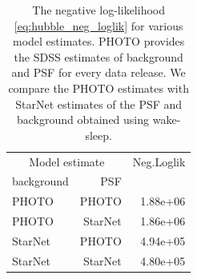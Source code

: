 
\begin{table}[ht]
\centering
\caption{The negative log-likelihood \eqref{eq:hubble_neg_loglik} for various model estimates. PHOTO provides the SDSS estimates of background and PSF for every data release. 
We compare the PHOTO estimates with StarNet estimates of the PSF and background obtained using wake-sleep. }
\label{tab:chi-square-stats1}
\begin{tabular}{lrr}
\toprule
\multicolumn{2}{c}{Model estimate} & Neg.Loglik \\
\cmidrule(lr){1-2} background & PSF &  \\
\midrule
PHOTO & PHOTO & 1.88e+06\\
PHOTO & StarNet & 1.86e+06 \\
StarNet & PHOTO & 4.94e+05\\
StarNet & StarNet & 4.80e+05 \\
\bottomrule
\end{tabular}
\end{table}


